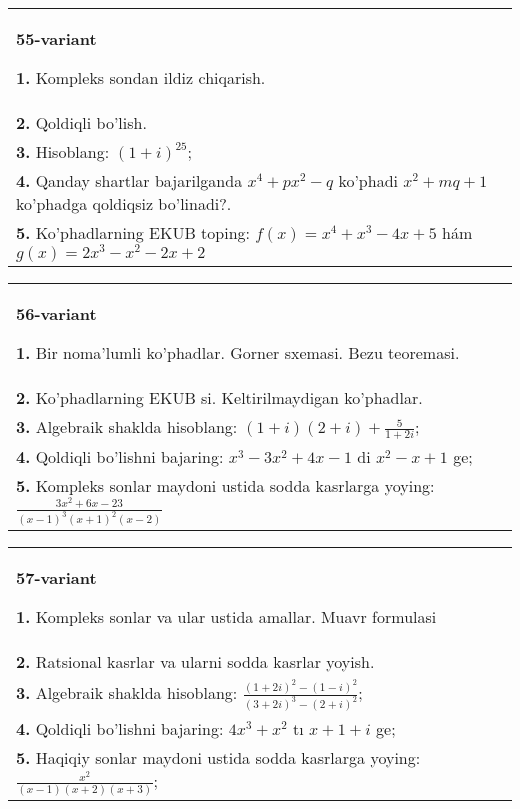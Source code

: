 \documentclass{article}
\begin{document}
\begin{tabular}{m{17cm}}
\textbf{55-variant}
\newline

\textbf{1.} Kompleks sondan ildiz chiqarish. \\
\textbf{2.} Qoldiqli bo’lish.  \\
\textbf{3.} Hisoblang:  $(1+i)^{25}$; \\
\textbf{4.} Qanday shartlar bajarilganda $x^4+p x^2-q$ ko’phadi $x^2+m q+1$ ko’phadga qoldiqsiz bo’linadi?. \\
\textbf{5.} Ko’phadlarning EKUB toping:  $f(x)=x^4+x^3-4 x+5$ hám $g(x)=2 x^3-x^2-2 x+2$ \\

\end{tabular}
\vspace{1cm}


\begin{tabular}{m{17cm}}
\textbf{56-variant}
\newline

\textbf{1.} Bir noma’lumli ko’phadlar. Gorner sxemasi. Bezu teoremasi.  \\
\textbf{2.} Ko’phadlarning EKUB si. Keltirilmaydigan ko’phadlar. \\
\textbf{3.} Algebraik shaklda hisoblang:  $(1+i)(2+i)+\frac{5}{1+2 i}$; \\
\textbf{4.} Qoldiqli bo’lishni bajaring:  $x^3-3 x^2+4 x-1$ di $x^2-x+1$ ge; \\
\textbf{5.} Kompleks sonlar maydoni ustida sodda kasrlarga yoying:$\frac{3 x^2+6 x-23}{(x-1)^3(x+1)^2(x-2)}$ \\

\end{tabular}
\vspace{1cm}


\begin{tabular}{m{17cm}}
\textbf{57-variant}
\newline

\textbf{1.} Kompleks sonlar va ular ustida amallar. Muavr formulasi  \\
\textbf{2.} Ratsional kasrlar va ularni sodda kasrlar yoyish. \\
\textbf{3.} Algebraik shaklda hisoblang:  $\frac{(1+2 i)^2-(1-i)^2}{(3+2 i)^3-(2+i)^2}$; \\
\textbf{4.} Qoldiqli bo’lishni bajaring: $4 x^3+x^2$ tı $x+1+i$ ge; \\
\textbf{5.} Haqiqiy sonlar maydoni ustida sodda kasrlarga yoying:  $\frac{x^2}{(x-1)(x+2)(x+3)}$; \\

\end{tabular}
\vspace{1cm}
\end{document}
